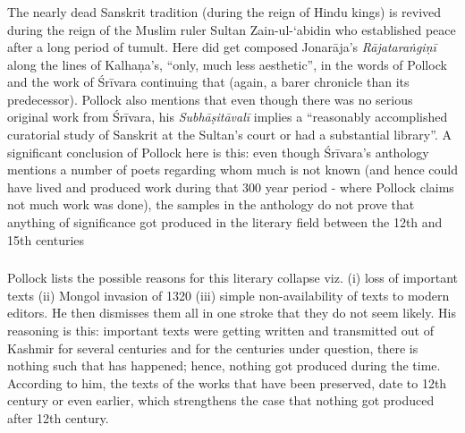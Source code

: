 \subsubsection{} The nearly dead Sanskrit tradition (during the reign of Hindu kings) is revived during the reign of the Muslim ruler Sultan Zain-ul-‘abidin who established peace after a long period of tumult. Here did get composed Jonarāja’s {\sl Rājataraṅgiṇī} along the lines of Kalhaṇa’s, “only, much less aesthetic”, in the words of Pollock and the work of Śrīvara continuing that (again, a barer chronicle than its predecessor). Pollock also mentions that even though there was no serious original work from Śrīvara, his {\sl Subhāṣitāvalī} implies a “reasonably accomplished curatorial study of Sanskrit at the Sultan’s court or had a substantial library”. A significant conclusion of Pollock here is this: even though Śrīvara’s anthology mentions a number of poets regarding whom much is not known (and hence could have lived and produced work during that 300 year period - where Pollock claims not much work was done), the samples in the anthology do not prove that anything of significance got produced in the literary field between the 12th and 15th centuries

\subsubsection{} Pollock lists the possible reasons for this literary collapse viz. (i) loss of important texts (ii) Mongol invasion of 1320 (iii) simple non-availability of texts to modern editors. He then dismisses them all in one stroke that they do not seem likely. His reasoning is this: important texts were getting written and transmitted out of Kashmir for several centuries and for the centuries under question, there is nothing such that has happened; hence, nothing got produced during the time. According to him, the texts of the works that have been preserved, date to 12th century or even earlier, which strengthens the case that nothing got produced after 12th century.

